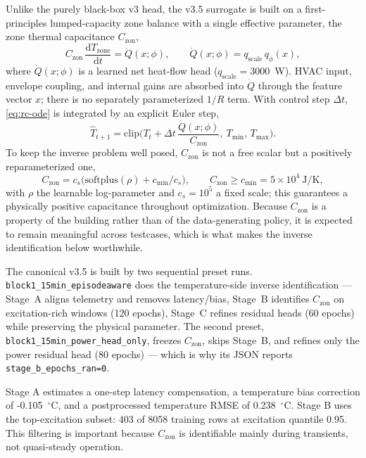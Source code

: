 \documentclass[11pt,a4paper]{article}
\newcommand{\Czon}{\ensuremath{C_{\mathrm{zon}}}}
\newcommand{\That}{\ensuremath{\widehat{T}}}
\begin{document}
Unlike the purely black-box v3 head, the v3.5 surrogate is built on a first-principles lumped-capacity zone balance with a single effective parameter, the zone thermal capacitance \(\Czon\),
\begin{equation}
  \Czon\,\frac{\mathrm{d}T_{\mathrm{zone}}}{\mathrm{d}t} = \dot{Q}(x;\phi),
  \qquad \dot{Q}(x;\phi)=q_{\mathrm{scale}}\,q_\phi(x),
  \label{eq:rc-ode}
\end{equation}
where \(\dot{Q}(x;\phi)\) is a learned net heat-flow head (\(q_{\mathrm{scale}}=3000\)~W). HVAC input, envelope coupling, and internal gains are absorbed into \(\dot{Q}\) through the feature vector \(x\); there is no separately parameterized \(1/R\) term. With control step \(\Delta t\), \eqref{eq:rc-ode} is integrated by an explicit Euler step,
\begin{equation}
  \That_{t+1} = \mathrm{clip}\!\Big(T_t + \Delta t\,\frac{\dot{Q}(x;\phi)}{\Czon},\ T_{\min},\,T_{\max}\Big).
  \label{eq:rc-euler}
\end{equation}
To keep the inverse problem well posed, \(\Czon\) is not a free scalar but a positively reparameterized one,
\begin{equation}
  \Czon = c_s\big(\mathrm{softplus}(\rho) + c_{\min}/c_s\big),
  \qquad \Czon \ge c_{\min} = 5\times10^4~\mathrm{J/K},
  \label{eq:czon-reparam}
\end{equation}
with \(\rho\) the learnable log-parameter and \(c_s=10^5\) a fixed scale; this guarantees a physically positive capacitance throughout optimization. Because \(\Czon\) is a property of the building rather than of the data-generating policy, it is expected to remain meaningful across testcases, which is what makes the inverse identification below worthwhile.

The canonical v3.5 is built by two sequential preset runs. \texttt{block1\_15min\_episodeaware} does the temperature-side inverse identification --- Stage~A aligns telemetry and removes latency/bias, Stage~B identifies \(\Czon\) on excitation-rich windows (120 epochs), Stage~C refines residual heads (60 epochs) while preserving the physical parameter. The second preset, \texttt{block1\_15min\_power\_head\_only}, freezes \(\Czon\), skips Stage~B, and refines only the power residual head (80 epochs) --- which is why its JSON reports \texttt{stage\_b\_epochs\_ran=0}.

Stage A estimates a one-step latency compensation, a temperature bias correction of -0.105~$^\circ$C, and a postprocessed temperature RMSE of 0.238~$^\circ$C. Stage B uses the top-excitation subset: 403 of 8058 training rows at excitation quantile 0.95. This filtering is important because \(\Czon\) is identifiable mainly during transients, not quasi-steady operation.
\end{document}

